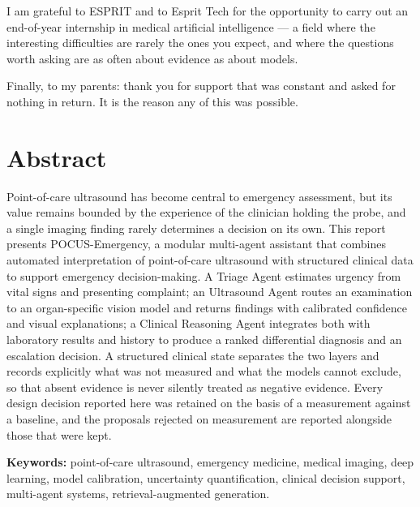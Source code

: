 \documentclass[11pt, a4paper]{article}
\begin{document}
\begin{sloppypar}
I am grateful to ESPRIT and to Esprit Tech for the opportunity to carry out an end-of-year
internship in medical artificial intelligence --- a field where the interesting difficulties
are rarely the ones you expect, and where the questions worth asking are as often about
evidence as about models.

Finally, to my parents: thank you for support that was constant and asked for nothing in
return. It is the reason any of this was possible.

\newpage

\section*{Abstract}
\noindent
Point-of-care ultrasound has become central to emergency assessment, but its value remains
bounded by the experience of the clinician holding the probe, and a single imaging finding
rarely determines a decision on its own. This report presents POCUS-Emergency, a modular
multi-agent assistant that combines automated interpretation of point-of-care ultrasound
with structured clinical data to support emergency decision-making. A Triage Agent
estimates urgency from vital signs and presenting complaint; an Ultrasound Agent routes an
examination to an organ-specific vision model and returns findings with calibrated
confidence and visual explanations; a Clinical Reasoning Agent integrates both with
laboratory results and history to produce a ranked differential diagnosis and an
escalation decision. A structured clinical state separates the two layers and records
explicitly what was not measured and what the models cannot exclude, so that absent
evidence is never silently treated as negative evidence. Every design decision reported
here was retained on the basis of a measurement against a baseline, and the proposals
rejected on measurement are reported alongside those that were kept.

\vspace{0.4cm}
\noindent\textbf{Keywords:} point-of-care ultrasound, emergency medicine, medical imaging,
deep learning, model calibration, uncertainty quantification, clinical decision support,
multi-agent systems, retrieval-augmented generation.

\vspace{1.2cm}


\end{sloppypar}
\end{document}
